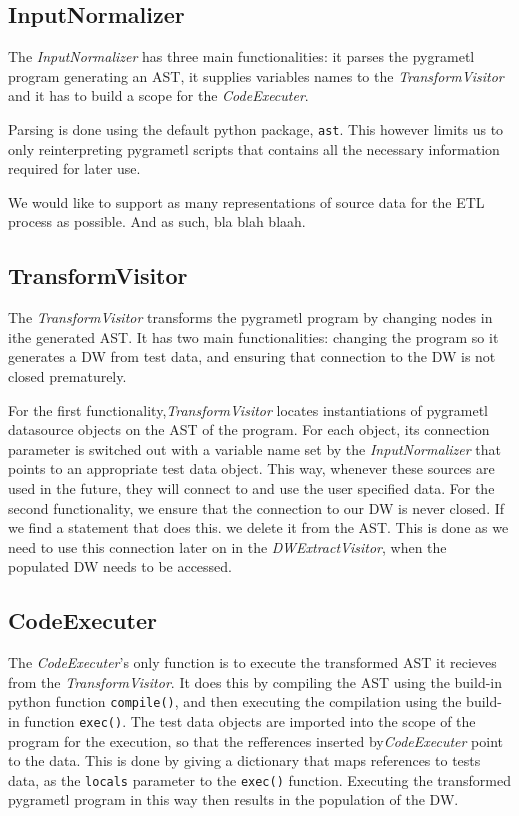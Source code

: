 \subsection{InputNormalizer}
The \textit{InputNormalizer} has three main functionalities: it parses the pygrametl program generating an AST, it supplies variables names to the \textit{TransformVisitor} and it has to build a scope for the \textit{CodeExecuter}.

 Parsing is done using the default python package, \texttt{ast}. This however limits us to only reinterpreting pygrametl scripts that contains all the necessary information required for later use.

We would like to support as many representations of source  data for the ETL process as possible. And as such, bla blah blaah. 


\subsection{TransformVisitor}
The \textit{TransformVisitor} transforms the pygrametl program by changing nodes in ithe generated AST. It has two main functionalities: changing the program so it generates a DW from test data, and ensuring that connection to the DW is not closed prematurely.  

For the first functionality,\textit{TransformVisitor} locates instantiations of pygrametl datasource objects on the AST of the program. For each object, its connection parameter is switched out with a variable name set by the \textit{InputNormalizer} that points to an appropriate test data object. This way, whenever these sources are used in the future, they will connect to and use the user specified data. For the second functionality, we ensure that the connection to our DW is never closed. If we find a statement that does this. we delete it from the AST. This is done as we need to use this connection later on in the \textit{DWExtractVisitor}, when the populated DW needs to be accessed. 

\subsection{CodeExecuter}
The \textit{CodeExecuter}'s only function is to execute the transformed AST it recieves from the \textit{TransformVisitor}. It does this by compiling the AST using the build-in python function \texttt{compile()}, and then executing the compilation using the build-in function \texttt{exec()}. The test data objects are imported into the scope of the program for the execution, so that the refferences inserted by\textit{CodeExecuter} point  to the data. This is done by giving a dictionary that maps references to tests data, as the \texttt{locals} parameter to the \texttt{exec()} function. Executing the transformed pygrametl program in this way then results in the population of the DW.

